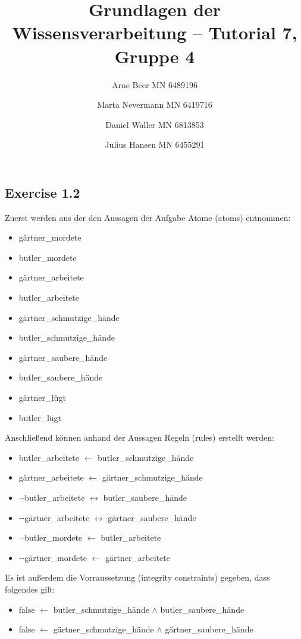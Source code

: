 \documentclass[]{article}
\title{Grundlagen der Wissensverarbeitung -- Tutorial 7, Gruppe 4}
\author{Arne Beer MN 6489196 \and Marta Nevermann MN 6419716 \and Daniel Waller MN 6813853 \and Julius Hansen MN 6455291}
\date{}
\begin{document}
\maketitle


\subsection{Exercise 1.2}\label{exercise-1.2}

Zuerst werden aus der den Aussagen der Aufgabe Atome (atoms) entnommen:

\begin{itemize}
\itemsep1pt\parskip0pt
\item
  gärtner\_mordete
\item
  butler\_mordete
\item
  gärtner\_arbeitete
\item
  butler\_arbeitete
\item
  gärtner\_schmutzige\_hände
\item
  butler\_schmutzige\_hände
\item
  gärtner\_saubere\_hände
\item
  butler\_saubere\_hände
\item
  gärtner\_lügt
\item
  butler\_lügt
\end{itemize}

Anschließend können anhand der Aussagen Regeln (rules) erstellt werden:

\begin{itemize}
\itemsep1pt\parskip0pt
\item
  butler\_arbeitete $\leftarrow$ butler\_schmutzige\_hände
\item
  gärtner\_arbeitete $\leftarrow$ gärtner\_schmutzige\_hände
\item
  $\neg$butler\_arbeitete $\leftrightarrow$ butler\_saubere\_hände
\item
  $\neg$gärtner\_arbeitete $\leftrightarrow$ gärtner\_saubere\_hände
\item
  $\neg$butler\_mordete $\leftarrow$ butler\_arbeitete
\item
  $\neg$gärtner\_mordete $\leftarrow$ gärtner\_arbeitete
\end{itemize}

Es ist außerdem die Vorraussetzung (integrity constraints) gegeben, dass
folgendes gilt:

\begin{itemize}
\itemsep1pt\parskip0pt
\item
  false $\leftarrow$ butler\_schmutzige\_hände $\wedge$
  butler\_saubere\_hände
\item
  false $\leftarrow$ gärtner\_schmutzige\_hände $\wedge$
  gärtner\_saubere\_hände
\end{itemize}
\end{document}
